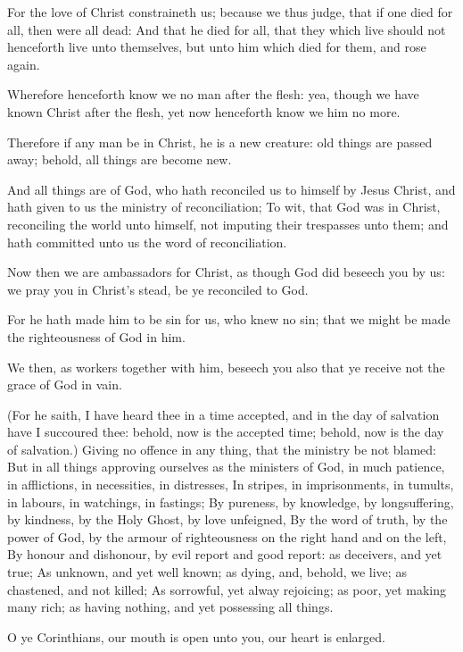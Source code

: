 \Verse For the love of Christ constraineth us; because we thus judge, that if one died for all, then were all dead: \Verse And that he died for all, that they which live should not henceforth live unto themselves, but unto him which died for them, and rose again.

\Verse Wherefore henceforth know we no man after the flesh: yea, though we have known Christ after the flesh, yet now henceforth know we him no more.

\Verse Therefore if any man be in Christ, he is a new creature: old things are passed away; behold, all things are become new.

\Verse And all things are of God, who hath reconciled us to himself by Jesus Christ, and hath given to us the ministry of reconciliation; \Verse To wit, that God was in Christ, reconciling the world unto himself, not imputing their trespasses unto them; and hath committed unto us the word of reconciliation.

\Verse Now then we are ambassadors for Christ, as though God did beseech you by us: we pray you in Christ's stead, be ye reconciled to God.

\Verse For he hath made him to be sin for us, who knew no sin; that we might be made the righteousness of God in him.


\Chapter
\Verse We then, as workers together with him, beseech you also that ye receive not the grace of God in vain.

\Verse (For he saith, I have heard thee in a time accepted, and in the day of salvation have I succoured thee: behold, now is the accepted time; behold, now is the day of salvation.)  \Verse Giving no offence in any thing, that the ministry be not blamed: \Verse But in all things approving ourselves as the ministers of God, in much patience, in afflictions, in necessities, in distresses, \Verse In stripes, in imprisonments, in tumults, in labours, in watchings, in fastings; \Verse By pureness, by knowledge, by longsuffering, by kindness, by the Holy Ghost, by love unfeigned, \Verse By the word of truth, by the power of God, by the armour of righteousness on the right hand and on the left, \Verse By honour and dishonour, by evil report and good report: as deceivers, and yet true; \Verse As unknown, and yet well known; as dying, and, behold, we live; as chastened, and not killed; \Verse As sorrowful, yet alway rejoicing; as poor, yet making many rich; as having nothing, and yet possessing all things.

\Verse O ye Corinthians, our mouth is open unto you, our heart is enlarged.

